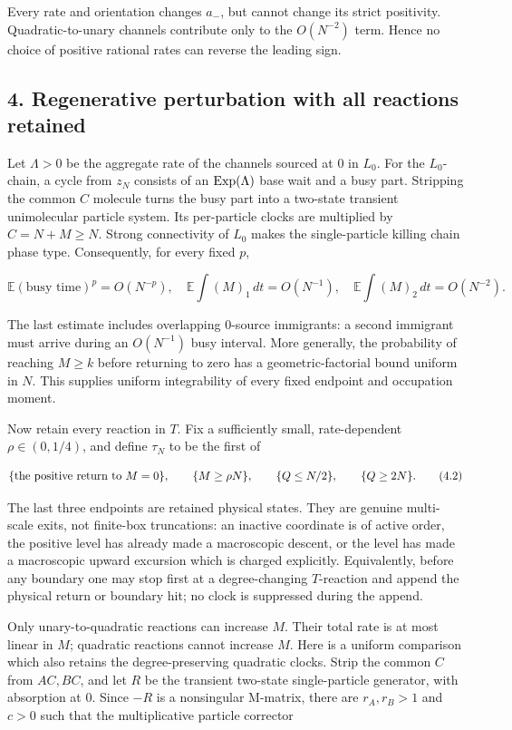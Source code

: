 Every rate and orientation changes \(a_-\), but cannot change its strict
positivity. Quadratic-to-unary channels contribute only to the
\(O(N^{-2})\) term. Hence no choice of positive rational rates can
reverse the leading sign.

\subsection{4. Regenerative perturbation with all reactions
retained}

Let \(\Lambda>0\) be the aggregate rate of the channels sourced at \(0\)
in \(L_0\). For the \(L_0\)-chain, a cycle from \(z_N\) consists of an
\({\rm Exp}(\Lambda)\) base wait and a busy part. Stripping the common
\(C\) molecule turns the busy part into a two-state transient
unimolecular particle system. Its per-particle clocks are multiplied by
\(C=N+M\geq N\). Strong connectivity of \(L_0\) makes the
single-particle killing chain phase type. Consequently, for every fixed
\(p\),

\[
 \mathbb E(\text{busy time})^p=O(N^{-p}),\quad
 \mathbb E\int (M)_1\,dt=O(N^{-1}),\quad
 \mathbb E\int (M)_2\,dt=O(N^{-2}).                  \tag{4.1}
\]

The last estimate includes overlapping \(0\)-source immigrants: a second
immigrant must arrive during an \(O(N^{-1})\) busy interval. More
generally, the probability of reaching \(M\geq k\) before returning to
zero has a geometric-factorial bound uniform in \(N\). This supplies
uniform integrability of every fixed endpoint and occupation moment.

Now retain every reaction in \(T\). Fix a sufficiently small,
rate-dependent \(\rho\in(0,1/4)\), and define \(\tau_N\) to be the first
of

\[
 \{\hbox{the positive return to }M=0\},\qquad
 \{M\geq\rho N\},\qquad
 \{Q\leq N/2\},\qquad
 \{Q\geq2N\}.                                        \tag{4.2}
\]

The last three endpoints are retained physical states. They are genuine
multi-scale exits, not finite-box truncations: an inactive coordinate is
of active order, the positive level has already made a macroscopic
descent, or the level has made a macroscopic upward excursion which is
charged explicitly. Equivalently, before any boundary one may stop first
at a degree-changing \(T\)-reaction and append the physical return or
boundary hit; no clock is suppressed during the append.

Only unary-to-quadratic reactions can increase \(M\). Their total rate
is at most linear in \(M\); quadratic reactions cannot increase \(M\).
Here is a uniform comparison which also retains the degree-preserving
quadratic clocks. Strip the common \(C\) from \(AC,BC\), and let \(R\)
be the transient two-state single-particle generator, with absorption at
\(0\). Since \(-R\) is a nonsingular M-matrix, there are \(r_A,r_B>1\)
and \(c>0\) such that the multiplicative particle corrector


